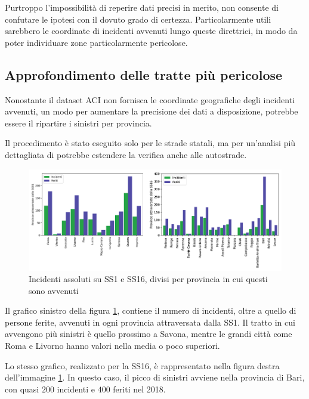 \documentclass[a4paper]{report}
\begin{document}
Purtroppo l'impossibilità di reperire dati precisi in merito, 
non consente di confutare le ipotesi con il dovuto grado di certezza.
Particolarmente utili sarebbero le coordinate di incidenti avvenuti lungo queste direttrici, 
in modo da poter individuare zone particolarmente pericolose.

\subsection{Approfondimento delle tratte più pericolose}

Nonostante il dataset ACI non fornisca le coordinate geografiche degli incidenti avvenuti, 
un modo per aumentare la precisione dei dati a disposizione, potrebbe essere il 
ripartire i sinistri per provincia. 

Il procedimento è stato eseguito solo per le strade statali, 
ma per un'analisi più dettagliata di potrebbe estendere la verifica anche alle autostrade.

\begin{figure}
    \includegraphics[width=\linewidth]{img_unite/tratti_ss1_ss16.png}
    \caption{Incidenti assoluti su SS1 e SS16, divisi per provincia in cui questi sono avvenuti}
    \label{fig:incidenti-strade-statali}
\end{figure}

Il grafico sinistro della figura \ref{fig:incidenti-strade-statali}, 
contiene il numero di incidenti, oltre a quello di persone ferite, 
avvenuti in ogni provincia attraversata dalla SS1. 
Il tratto in cui avvengono più sinistri è quello prossimo a Savona, 
mentre le grandi città come 
Roma e Livorno hanno valori nella media o poco superiori. 

Lo stesso grafico, realizzato per la SS16, è rappresentato nella figura destra dell'immagine 
\ref{fig:incidenti-strade-statali}. 
In questo caso, il picco di sinistri avviene nella provincia 
di Bari, con quasi $200$ incidenti e $400$ feriti nel 2018. 
\end{document}
